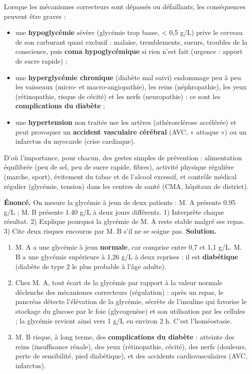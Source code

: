 \documentclass[11pt]{article}
\begin{document}
Lorsque les mécanismes correcteurs sont dépassés ou défaillants, les conséquences peuvent être graves :
\begin{itemize}
    \item une \textbf{hypoglycémie} sévère (glycémie trop basse, < 0,5 g/L) prive le cerveau de son carburant quasi exclusif : malaise, tremblements, sueurs, troubles de la conscience, puis \textbf{coma hypoglycémique} si rien n'est fait (urgence : apport de sucre rapide) ;
    \item une \textbf{hyperglycémie chronique} (diabète mal suivi) endommage peu à peu les vaisseaux (micro- et macro-angiopathie), les reins (néphropathie), les yeux (rétinopathie, risque de cécité) et les nerfs (neuropathie) : ce sont les \textbf{complications du diabète} ;
    \item une \textbf{hypertension} non traitée use les artères (athérosclérose accélérée) et peut provoquer un \textbf{accident vasculaire cérébral} (AVC, « attaque ») ou un infarctus du myocarde (crise cardiaque).
\end{itemize}
D'où l'importance, pour chacun, des gestes simples de prévention : alimentation équilibrée (peu de sel, peu de sucre rapide, fibres), activité physique régulière (marche, sport), évitement du tabac et de l'alcool excessif, et contrôle médical régulier (glycémie, tension) dans les centres de santé (CMA, hôpitaux de district).

\begin{exoresolu}
\textbf{Énoncé.} On mesure la glycémie à jeun de deux patients : M. A présente \num{0,95} g/L ; M. B présente \num{1,40} g/L à deux jours différents. 1) Interprète chaque résultat. 2) Explique pourquoi la glycémie de M. A reste stable malgré ses repas. 3) Cite deux risques encourus par M. B s'il ne se soigne pas.
\tcblower
\textbf{Solution.}
\begin{enumerate}
    \item M. A a une glycémie à jeun \textbf{normale}, car comprise entre 0,7 et 1,1 g/L. M. B a une glycémie supérieure à 1,26 g/L à deux reprises : il est \textbf{diabétique} (diabète de type 2 le plus probable à l'âge adulte).
    \item Chez M. A, tout écart de la glycémie par rapport à la valeur normale déclenche des mécanismes correcteurs (régulation) : après un repas, le pancréas détecte l'élévation de la glycémie, sécrète de l'insuline qui favorise le stockage du glucose par le foie (glycogenèse) et son utilisation par les cellules ; la glycémie revient ainsi vers 1 g/L en environ 2 h. C'est l'homéostasie.
    \item M. B risque, à long terme, des \textbf{complications du diabète} : atteinte des reins (insuffisance rénale), des yeux (rétinopathie, cécité), des nerfs (douleurs, perte de sensibilité, pied diabétique), et des accidents cardiovasculaires (AVC, infarctus).
\end{enumerate}
\end{exoresolu}
\end{document}
